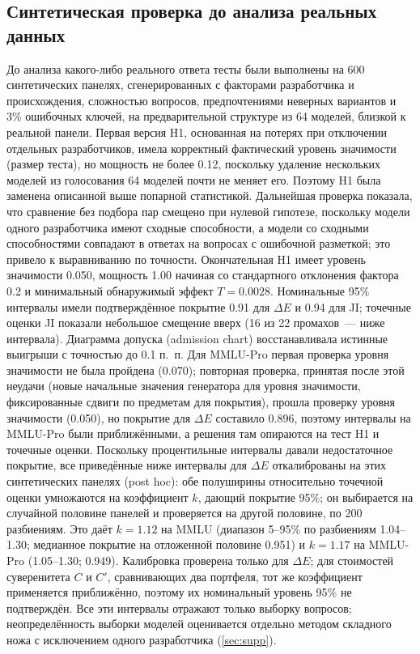 \documentclass[preprint,12pt,authoryear]{elsarticle}
\newcommand{\dE}{\Delta E}
\begin{document}
\subsection{Синтетическая проверка до анализа реальных данных}
До анализа какого-либо реального ответа тесты были выполнены на 600 синтетических панелях, сгенерированных с факторами разработчика и происхождения, сложностью вопросов, предпочтениями неверных вариантов и 3\% ошибочных ключей, на предварительной структуре из 64 моделей, близкой к реальной панели. Первая версия H1, основанная на потерях при отключении отдельных разработчиков, имела корректный фактический уровень значимости (размер теста), но мощность не более 0.12, поскольку удаление нескольких моделей из голосования 64 моделей почти не меняет его. Поэтому H1 была заменена описанной выше попарной статистикой. Дальнейшая проверка показала, что сравнение без подбора пар смещено при нулевой гипотезе, поскольку модели одного разработчика имеют сходные способности, а модели со сходными способностями совпадают в ответах на вопросах с ошибочной разметкой; это привело к выравниванию по точности. Окончательная H1 имеет уровень значимости 0.050, мощность 1.00 начиная со стандартного отклонения фактора 0.2 и минимальный обнаружимый эффект $T=0.0028$. Номинальные 95\% интервалы имели подтверждённое покрытие 0.91 для $\dE$ и 0.94 для JI; точечные оценки JI показали небольшое смещение вверх (16 из 22 промахов~--- ниже интервала). Диаграмма допуска (admission chart) восстанавливала истинные выигрыши с точностью до 0.1 п.~п. Для MMLU-Pro первая проверка уровня значимости не была пройдена (0.070); повторная проверка, принятая после этой неудачи (новые начальные значения генератора для уровня значимости, фиксированные сдвиги по предметам для покрытия), прошла проверку уровня значимости (0.050), но покрытие для $\dE$ составило 0.896, поэтому интервалы на MMLU-Pro были приближёнными, а решения там опираются на тест H1 и точечные оценки. Поскольку процентильные интервалы давали недостаточное покрытие, все приведённые ниже интервалы для $\dE$ откалиброваны на этих синтетических панелях (post hoc): обе полуширины относительно точечной оценки умножаются на коэффициент $k$, дающий покрытие 95\%; он выбирается на случайной половине панелей и проверяется на другой половине, по 200 разбиениям. Это даёт $k = 1.12$ на MMLU (диапазон 5--95\% по разбиениям 1.04--1.30; медианное покрытие на отложенной половине 0.951) и $k = 1.17$ на MMLU-Pro (1.05--1.30; 0.949). Калибровка проверена только для $\dE$; для стоимостей суверенитета $C$ и $C'$, сравнивающих два портфеля, тот же коэффициент применяется приближённо, поэтому их номинальный уровень 95\% не подтверждён. Все эти интервалы отражают только выборку вопросов; неопределённость выборки моделей оценивается отдельно методом складного ножа с исключением одного разработчика (\ref{sec:supp}).
\end{document}
